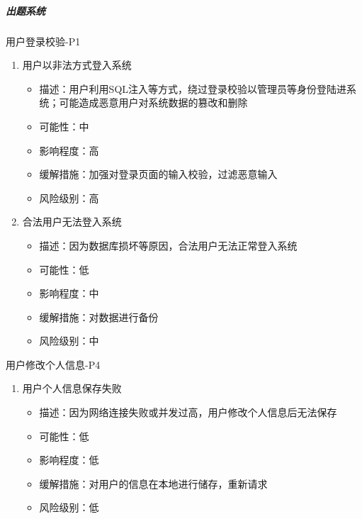 \documentclass[hyperref, a4paper]{ctexart}
\providecommand{\tightlist}{%
  \setlength{\itemsep}{0pt}\setlength{\parskip}{0pt}}
\let\oldsubparagraph\subparagraph
\renewcommand{\subparagraph}[1]{\oldsubparagraph{#1}\mbox{}}
\begin{document}
\hypertarget{ux51faux9898ux7cfbux7edf-3}{%
\subparagraph{出题系统}\label{ux51faux9898ux7cfbux7edf-3}}

用户登录校验-P1

\begin{enumerate}
\def\labelenumi{\arabic{enumi}.}
\tightlist
\item
  用户以非法方式登入系统

  \begin{itemize}
  \tightlist
  \item
    描述：用户利用SQL注入等方式，绕过登录校验以管理员等身份登陆进系统；可能造成恶意用户对系统数据的篡改和删除
  \item
    可能性：中
  \item
    影响程度：高
  \item
    缓解措施：加强对登录页面的输入校验，过滤恶意输入
  \item
    风险级别：高
  \end{itemize}
\item
  合法用户无法登入系统

  \begin{itemize}
  \tightlist
  \item
    描述：因为数据库损坏等原因，合法用户无法正常登入系统
  \item
    可能性：低
  \item
    影响程度：中
  \item
    缓解措施：对数据进行备份
  \item
    风险级别：中
  \end{itemize}
\end{enumerate}

用户修改个人信息-P4

\begin{enumerate}
\def\labelenumi{\arabic{enumi}.}
\tightlist
\item
  用户个人信息保存失败

  \begin{itemize}
  \tightlist
  \item
    描述：因为网络连接失败或并发过高，用户修改个人信息后无法保存
  \item
    可能性：低
  \item
    影响程度：低
  \item
    缓解措施：对用户的信息在本地进行储存，重新请求
  \item
    风险级别：低
  \end{itemize}
\end{enumerate}
\end{document}
